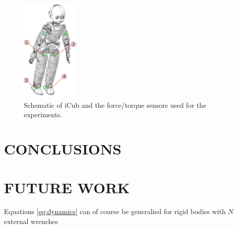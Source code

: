 \documentclass[letterpaper, 10 pt, conference]{ieeeconf}  %
\begin{document}
\begin{figure}[t!]  
  \centering
    \includegraphics[width=0.25\textwidth]{./figs/icub_force_selected.png}
    \caption{Schematic of iCub and the force/torque sensors used for the experiments. 
    \label{fig:icub_ft_sensors}}
\end{figure}


\section{CONCLUSIONS}
\label{section:conclusions}

\section{FUTURE WORK}
\label{section:futureWork}
Equations \ref{eq:dynamics} can of course be generalied for rigid bodies with $N$ external wrenches 

%


\end{document}
